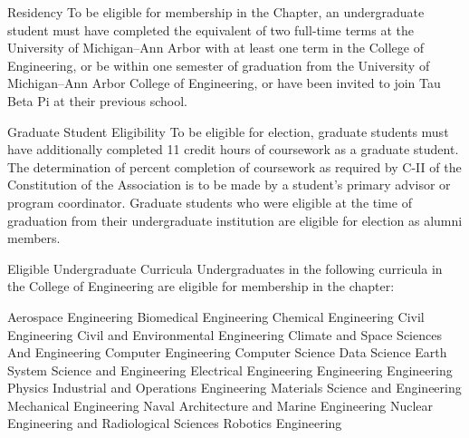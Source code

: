 \begin{enumsubsection}
\item{Residency} To be eligible for membership in the Chapter, an undergraduate student must have completed the equivalent of two full-time terms at the University of Michigan--Ann Arbor with at least one term in the College of Engineering, or be within one semester of graduation from the University of Michigan--Ann Arbor College of Engineering, or have been invited to join Tau Beta Pi at their previous school.
\item{Graduate Student Eligibility}\label{sec:grad_elig} To be eligible for election, graduate students must have additionally completed 11 credit hours of coursework as a graduate student. The determination of percent completion of coursework as required by C-II of the Constitution of the Association is to be made by a student's primary advisor or program coordinator. Graduate students who were eligible at the time of graduation from their undergraduate institution are eligible for election as alumni members.
\item{Eligible Undergraduate Curricula}\label{sec:ugrad_cur}  Undergraduates in the following curricula in the College of Engineering are eligible for membership in the chapter:

\let\oldenumi\labelenumii
\renewcommand{\labelenumii}{\arabic{enumii}.}
\begin{enumsubsubsection}

\itemnotoc Aerospace Engineering
\itemnotoc Biomedical Engineering
\itemnotoc Chemical Engineering
\itemnotoc Civil Engineering
\itemnotoc Civil and Environmental Engineering
\itemnotoc Climate and Space Sciences And Engineering
\itemnotoc Computer Engineering
\itemnotoc Computer Science
\itemnotoc Data Science
\itemnotoc Earth System Science and Engineering
\itemnotoc Electrical Engineering
\itemnotoc Engineering
\itemnotoc Engineering Physics
\itemnotoc Industrial and Operations Engineering
\itemnotoc Materials Science and Engineering
\itemnotoc Mechanical Engineering
\itemnotoc Naval Architecture and Marine Engineering
\itemnotoc Nuclear Engineering and Radiological Sciences
\itemnotoc Robotics Engineering


\end{enumsubsubsection}
\end{enumsubsection}
